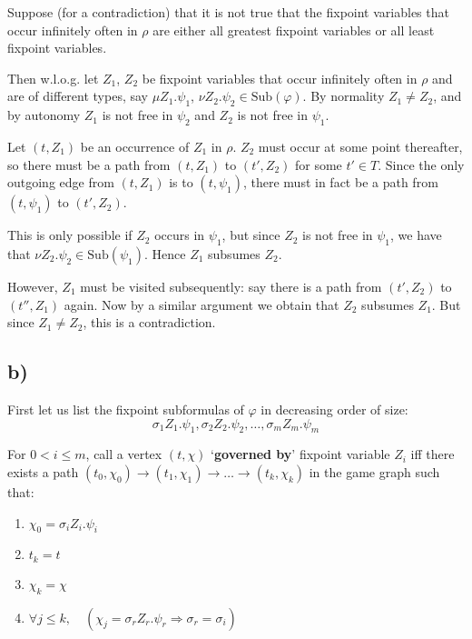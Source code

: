 \documentclass[11pt]{article}
\begin{document}
Suppose (for a contradiction) that it is not true that the fixpoint variables
that occur infinitely often in $\rho$ are either all greatest fixpoint
variables or all least fixpoint variables.

Then w.l.o.g. let $Z_1$, $Z_2$ be fixpoint variables that occur infinitely
often in $\rho$ and are of different types, say $\mu Z_1 . \psi_1$, $\nu Z_2 .
\psi_2 \in \text{Sub}(\varphi)$.  
By normality $Z_1 \neq Z_2$, and by autonomy $Z_1$ is not free in $\psi_2$ and
$Z_2$ is not free in $\psi_1$.

Let $(t, Z_1)$ be an occurrence of $Z_1$ in $\rho$. $Z_2$ must occur at some
point thereafter, so there must be a path from $(t, Z_1)$ to $(t', Z_2)$ for
some $t' \in T$. Since the only outgoing edge from $(t, Z_1)$ is to $(t,
\psi_1)$, there must in fact be a path from $(t, \psi_1)$ to $(t', Z_2)$.
   
This is only possible if $Z_2$ occurs in $\psi_1$, but since $Z_2$ is not free
in $\psi_1$, we have that $\nu Z_2 . \psi_2 \in \text{Sub}(\psi_1)$. Hence
$Z_1$ subsumes $Z_2$.

However, $Z_1$ must be visited subsequently: say there is a path from
$(t',Z_2)$ to $(t'',Z_1)$ again. Now by a similar argument we obtain that $Z_2$
subsumes $Z_1$. But since $Z_1 \neq Z_2$, this is a contradiction.

\subsection*{b)}

First let us list the fixpoint subformulas of $\varphi$ in decreasing order of size:
\begin{displaymath}
\sigma_1 Z_1. \psi_1,
\sigma_2 Z_2. \psi_2,
\dots,
\sigma_m Z_m. \psi_m
\end{displaymath}

For $0 < i \leq m$, call a vertex $(t, \chi)$ `\textbf{governed by}' fixpoint
variable $Z_i$ iff there exists a path $(t_0, \chi_0) \rightarrow (t_1, \chi_1)
\rightarrow \dots \rightarrow (t_k, \chi_k)$ in the game graph such that:

\begin{enumerate}
   \item{$\chi_0 = \sigma_i Z_i. \psi_i$}
   \item{$t_k = t $}
   \item{$\chi_k = \chi$}
   \item{$\forall j \leq k, \quad (\chi_j = \sigma_r Z_r. \psi_r \Rightarrow  \sigma_r = \sigma_i) $}
\end{enumerate}
\end{document}
